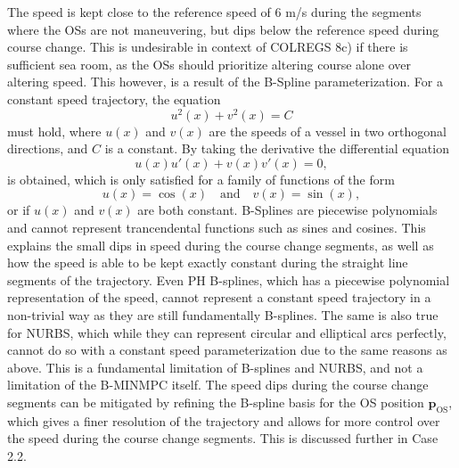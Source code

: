 The speed is kept close to the reference speed of 6 m/s during the segments where the OSs are not maneuvering, but dips below the reference speed during course change.  This is undesirable in context of COLREGS 8c) if there is sufficient sea room, as the OSs should prioritize altering course alone over altering speed.  This however, is a result of the B-Spline parameterization. For a constant speed trajectory, the equation
\begin{equation*}
    u^2(x) + v^2(x) = C
\end{equation*}
must hold, where $u(x)$ and $v(x)$ are the speeds of a vessel in two orthogonal directions, and $C$ is a constant. By taking the derivative the differential equation
\begin{equation*}
    u(x)u'(x) + v(x)v'(x) = 0,
\end{equation*}
is obtained, which is only satisfied for a family of functions of the form
\begin{equation*}
    u(x) = \cos(x) \quad \text{and} \quad v(x) = \sin(x),
\end{equation*}
or if $u(x)$ and $v(x)$ are both constant.  B-Splines are piecewise polynomials and cannot represent trancendental functions such as sines and cosines.  This explains the small dips in speed during the course change segments, as well as how the speed is able to be kept exactly constant during the straight line segments of the trajectory.  Even PH B-splines, which has a piecewise polynomial representation of the speed, cannot represent a constant speed trajectory in a non-trivial way as they are still fundamentally B-splines.  The same is also true for NURBS, which while they can represent circular and elliptical arcs perfectly, cannot do so with a constant speed parameterization due to the same reasons as above.  This is a fundamental limitation of B-splines and NURBS, and not a limitation of the B-MINMPC itself.  The speed dips during the course change segments can be mitigated by refining the B-spline basis for the OS position $\mathbf p_\text{OS}$, which gives a finer resolution of the trajectory and allows for more control over the speed during the course change segments. This is discussed further in Case 2.2.



